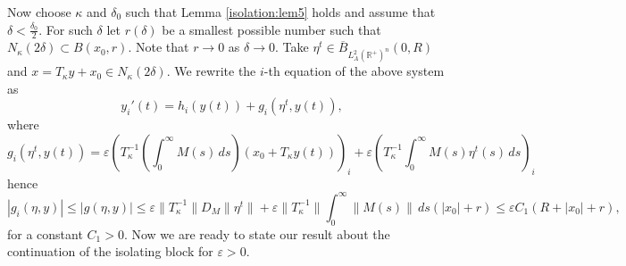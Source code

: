 \documentclass[11pt, leqno]{amsart}
\theoremstyle{definition}
\def\R{\mathbb{R}}
\begin{document}
Now choose $\kappa$ and $\delta_0$ such that Lemma \ref{isolation:lem5} holds and assume that $\delta < \frac{\delta_0}{2}$. For such $\delta$ let $r(\delta)$ be a smallest possible number such that $N_\kappa(2\delta) \subset B(x_0,r)$. Note that $r\to 0$ as $\delta \to 0$. Take $\eta^t \in \overline{B}_{L^2_A(\R^+)^n}(0,R)$ and $x=T_\kappa y+x_0 \in N_\kappa(2\delta)$. We rewrite the $i$-th equation of the above system as
$$
y_i'(t) = h_i(y(t)) + g_i(\eta^t,y(t)),
$$
where
$$
g_i(\eta^t,y(t)) = \varepsilon \left(T_{\kappa}^{-1} \left(\int_0^\infty M(s)\, ds\right) (x_0+ T_\kappa y(t))\right)_i + \varepsilon \left(T_\kappa^{-1}\int_0^\infty M(s) \eta^t(s)\, ds\right)_i
$$
hence
\begin{equation}\label{eq:gi}
|g_i(\eta,y)|\leq |g(\eta,y)| \leq \varepsilon \|T_\kappa^{-1}\|D_M\|\eta^t\| + \varepsilon  \|T_\kappa^{-1}\|\int_0^\infty \|M(s)\|\, ds (|x_0| + r) \leq  \varepsilon C_1 (R+|x_0|+r),
\end{equation}
for a constant $C_1>0$. Now we are ready to state our result about the continuation of the isolating block for $\varepsilon >0$.
\end{document}
